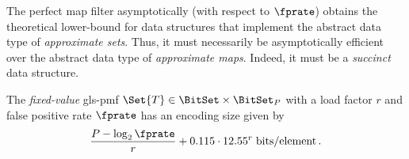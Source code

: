 \documentclass[ ../main.tex]{subfiles}
\begin{document}
The perfect map filter asymptotically (with respect to $\fprate$) obtains the theoretical lower-bound for data structures that implement the abstract data type of \emph{approximate sets}. Thus, it must necessarily be asymptotically efficient over the abstract data type of \emph{approximate maps}. Indeed, it must be a \emph{succinct} data structure.

\begin{conjecture}
The \emph{fixed-value} \gls{gls-pmf} $\Set{T} \in \BitSet \times \BitSet_P$ with a load factor $r$ and false positive rate $\fprate$ has an encoding size given by
\begin{equation}
    \frac{P - \log_2 \fprate}{r} + 0.115 \cdot 12.55^r \; \si{bits \per element}\,.
\end{equation}
\end{conjecture}
\end{document}
